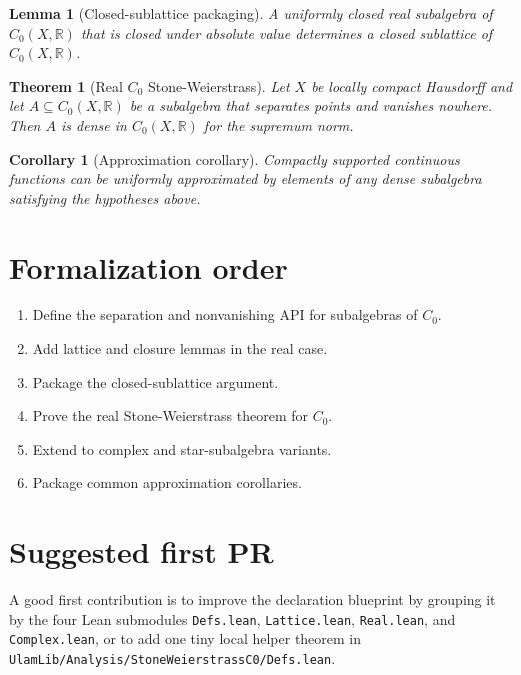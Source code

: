 \documentclass[11pt]{article}
\newtheorem{lemma}[definition]{Lemma}
\newtheorem{theorem}[definition]{Theorem}
\newtheorem{corollary}[definition]{Corollary}
\begin{document}
\begin{lemma}[Closed-sublattice packaging]\label{lem:closed-sublattice-packaging}
A uniformly closed real subalgebra of $C_0(X,\mathbb{R})$ that is closed under
absolute value determines a closed sublattice of $C_0(X,\mathbb{R})$.
\end{lemma}

\begin{theorem}[Real $C_0$ Stone-Weierstrass]\label{thm:real-c0-stone-weierstrass}
Let $X$ be locally compact Hausdorff and let
$A \subseteq C_0(X, \mathbb{R})$ be a subalgebra that separates points and
vanishes nowhere. Then $A$ is dense in $C_0(X, \mathbb{R})$ for the supremum
norm.
\end{theorem}

\begin{corollary}[Approximation corollary]\label{cor:compact-support-approximation}
Compactly supported continuous functions can be uniformly approximated by
elements of any dense subalgebra satisfying the hypotheses above.
\end{corollary}

\section{Formalization order}

\begin{enumerate}
\item Define the separation and nonvanishing API for subalgebras of $C_0$.
\item Add lattice and closure lemmas in the real case.
\item Package the closed-sublattice argument.
\item Prove the real Stone-Weierstrass theorem for $C_0$.
\item Extend to complex and star-subalgebra variants.
\item Package common approximation corollaries.
\end{enumerate}

\section{Suggested first PR}

A good first contribution is to improve the declaration blueprint by grouping it
by the four Lean submodules \texttt{Defs.lean}, \texttt{Lattice.lean},
\texttt{Real.lean}, and \texttt{Complex.lean}, or to add one tiny local helper
theorem in \texttt{UlamLib/Analysis/StoneWeierstrassC0/Defs.lean}.
\end{document}
